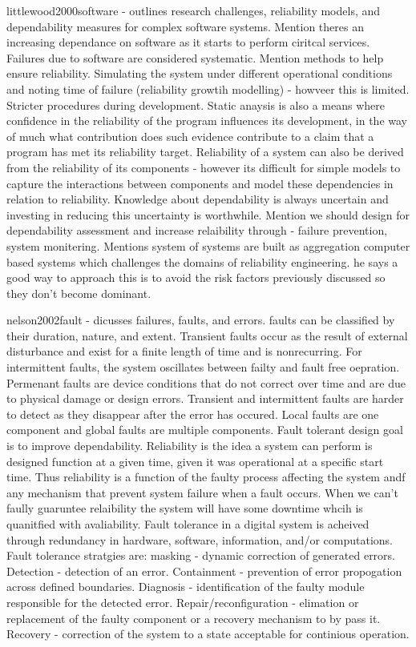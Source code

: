 littlewood2000software - outlines research challenges, reliability models, and dependability measures for complex software systems. Mention theres an increasing dependance on software as it starts to perform ciritcal services. Failures due to software are considered systematic. Mention methods to help ensure reliability. Simulating the system under different operational conditions and noting time of failure (reliability growtih modelling) - howveer this is limited. Stricter procedures during development. Static anaysis is also a means where confidence in the reliability of the program influences its development, in the way of much what contribution does such evidence contribute to a claim that a program has met its reliability target. Reliability of a system can also be derived from the reliability of its components - however its difficult for simple models to capture the interactions between components and model these dependencies in relation to reliability. Knowledge about dependability is always uncertain and investing in reducing this uncertainty is worthwhile. Mention we should design for dependability assessment and increase relaibility through - failure prevention, system monitering. Mentions system of systems are built as aggregation computer based systems which challenges the domains of reliability engineering. he says a good way to approach this is to avoid the risk factors previously discussed so they don't become dominant.


nelson2002fault - dicusses failures, faults, and errors. faults can be classified by their duration, nature, and extent. Transient faults occur as the result of external disturbance and exist for a finite length of time and is nonrecurring. For intermittent faults, the system oscillates between failty and fault free oepration. Permenant faults are device conditions that do not correct over time and are due to physical damage or design errors. Transient and intermittent faults are harder to detect as they disappear after the error has occured. Local faults are one component and global faults are multiple components. Fault tolerant design goal is to improve dependability. Reliability is the idea a system can perform is designed function at a given time, given it was operational at a specific start time. Thus reliability is a function of the faulty process affecting the system andf any mechanism that prevent system failure when a fault occurs. When we can't faully guaruntee relaibility the system will have some downtime whcih is quanitfied with avaliability. Fault tolerance in a digital system is acheived through redundancy in hardware, software, information, and/or computations. Fault tolerance stratgies are: masking - dynamic correction of generated errors. Detection - detection of an error. Containment - prevention of error propogation across defined boundaries. Diagnosis - identification of the faulty module responsible for the detected error. Repair/reconfiguration - elimation or replacement of the faulty component or a recovery mechanism to by pass it. Recovery - correction of the system to a state acceptable for continious operation.



